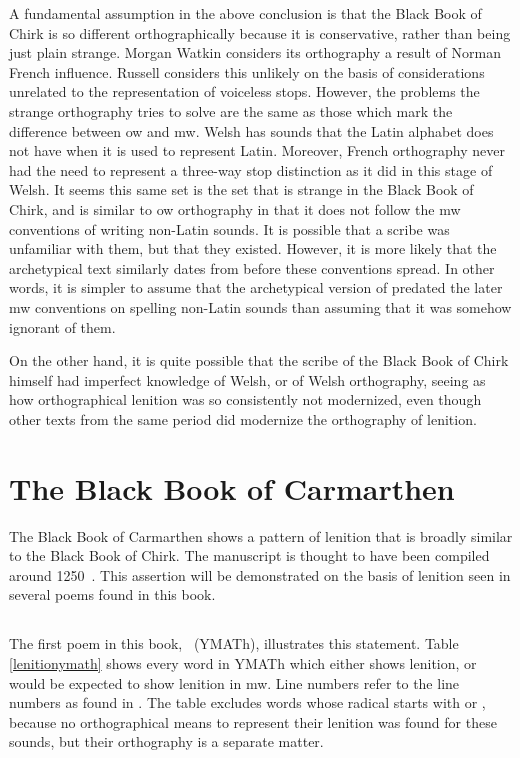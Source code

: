 A fundamental assumption in the above conclusion is that the Black Book of Chirk is so different orthographically because it is conservative, rather than being just plain strange. Morgan Watkin considers its orthography a result of Norman French influence\parencite*{watkin_black_1966}. Russell considers this unlikely on the basis of considerations unrelated to the representation of voiceless stops\parencite*[143--144]{russell_scribal_1995}. However, the problems the strange orthography tries to solve are the same as those which mark the difference between \gls{ow} and \gls{mw}. Welsh has sounds that the Latin alphabet does not have when it is used to represent Latin. Moreover, French orthography never had the need to represent a three-way stop distinction as it did in this stage of Welsh. It seems this same set is the set that is strange in the Black Book of Chirk, and is similar to \gls{ow} orthography in that it does not follow the \gls{mw} conventions of writing non-Latin sounds. It is possible that a scribe was unfamiliar with them, but that they existed. However, it is more likely that the archetypical  text similarly dates from before these conventions spread. In other words, it is simpler to assume that the archetypical version of  predated the later \gls{mw} conventions on spelling non-Latin sounds than assuming that it was somehow ignorant of them.

On the other hand, it is quite possible that the scribe of the Black Book of Chirk himself had imperfect knowledge of Welsh, or of Welsh orthography, seeing as how orthographical lenition was so consistently not modernized, even though other texts from the same period did modernize the orthography of lenition.

\section{The Black Book of Carmarthen}
The Black Book of Carmarthen shows a pattern of lenition that is broadly similar to the Black Book of Chirk. The manuscript is thought to have been compiled around 1250~\autocite[xxiv]{jones_rhagymadrodd_1982}. This assertion will be demonstrated on the basis of lenition seen in several poems found in this book.
\subsection{}
The first poem in this book, ~(YMATh), illustrates this statement. Table \ref{lenitionymath} shows every word in YMATh which either shows lenition, or would be expected to show lenition in \gls{mw}. Line numbers refer to the line numbers as found in \textcite{jarman_llyfr_1982}. The table excludes words whose radical starts with  or , because no orthographical means to represent their lenition was found for these sounds, but their orthography is a separate matter. 

